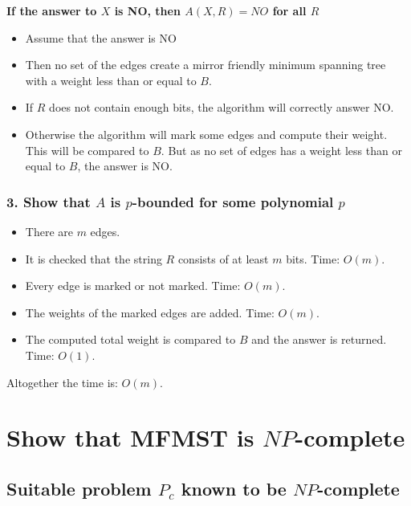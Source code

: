 \documentclass[12pt]{report}
\begin{document}
\textbf{If the answer to $X$ is NO, then $A(X, R) = NO$ for all $R$}
\begin{itemize}
	\item[] Assume that the answer is NO
	
	\item[] Then no set of the edges create a mirror friendly minimum spanning tree with a weight less than or equal to $B$.
	
	\item[] If $R$ does not contain enough bits, the algorithm will correctly answer NO.
	
	\item[] Otherwise the algorithm will mark some edges and compute their weight. This will be compared to $B$. But as no set of edges has a weight less than or equal to $B$, the answer is NO.
\end{itemize}

\subsubsection{3. Show that $A$ is $p$-bounded for some polynomial $p$}
\begin{itemize}
	\item[] There are $m$ edges.
	
	\item[] It is checked that the string $R$ consists of at least $m$ bits. Time: $O(m)$.
	
	\item[] Every edge is marked or not marked. Time: $O(m)$.
	
	\item[] The weights of the marked edges are added. Time: $O(m)$.
	
	\item[] The computed total weight is compared to $B$ and the answer is returned. Time: $O(1)$.
\end{itemize}

Altogether the time is: $O(m)$.

\section{Show that MFMST is $NP$-complete}
\subsection{Suitable problem $P_c$ known to be $NP$-complete}
\end{document}
